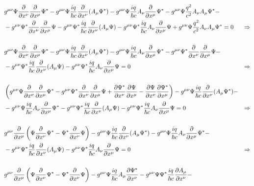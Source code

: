 \begin{align*}
  &g^{\mu\nu} \Psi \party{}{x^\nu} \party{}{x^\mu} \Psi^*-   g^{\mu\nu} \Psi \frac{iq}{\hbar c}\party{}{x^\nu}(A_\mu\Psi^*)-g^{\mu\nu}  \Psi \frac{iq}{\hbar c} A_\nu \party{}{x^\mu} \Psi^*  -g^{\mu\nu} \Psi \frac{q^2}{c^2}A_\nu A_\mu \Psi^* -
  \\& -g^{\mu\nu} \Psi^* \party{}{x^\nu} \party{}{x^\mu} \Psi - g^{\mu\nu} \Psi^* \frac{iq}{\hbar c}\party{}{x^\nu}(A_\mu \Psi) - g^{\mu\nu}  \Psi^*  \frac{iq}{\hbar c} A_\nu \party{}{x^\mu} \Psi  +g^{\mu\nu} \Psi \frac{q^2}{c^2}A_\nu A_\mu \Psi^* =0  &\Rightarrow
  \\
  \\ &g^{\mu\nu} \Psi \party{}{x^\nu} \party{}{x^\mu} \Psi^*-   g^{\mu\nu} \Psi \frac{iq}{\hbar c}\party{}{x^\nu}(A_\mu\Psi^*)-g^{\mu\nu}  \Psi \frac{iq}{\hbar c} A_\nu \party{}{x^\mu} \Psi^*-g^{\mu\nu} \Psi^* \party{}{x^\nu} \party{}{x^\mu} \Psi -
  \\&-g^{\mu\nu} \Psi^* \frac{iq}{\hbar c}\party{}{x^\nu}(A_\mu \Psi) - g^{\mu\nu}  \Psi^*  \frac{iq}{\hbar c} A_\nu \party{}{x^\mu} \Psi =0  &\Rightarrow 
  \\
  \\ &\lbr g^{\mu\nu} \Psi \party{}{x^\nu} \party{}{x^\mu} \Psi^*-g^{\mu\nu} \Psi^* \party{}{x^\nu} \party{}{x^\mu} \Psi+ \party{\Psi^*}{x^\nu} \party{\Psi}{x^\mu}-\party{\Psi}{x^\nu} \party{\Psi^*}{x^\mu} \rbr -   g^{\mu\nu} \Psi \frac{iq}{\hbar c}\party{}{x^\nu}(A_\mu\Psi^*)-
  \\&-g^{\mu\nu}  \Psi \frac{iq}{\hbar c} A_\nu \party{}{x^\mu} \Psi^* -g^{\mu\nu} \Psi^* \frac{iq}{\hbar c}\party{}{x^\nu}(A_\mu \Psi) - g^{\mu\nu}  \Psi^*  \frac{iq}{\hbar c} A_\nu \party{}{x^\mu} \Psi =0  &\Rightarrow 
  \\
  \\ &g^{\mu\nu} \party{}{x^\mu} \lbr   \Psi\party{}{x^\nu}\Psi^*  - \Psi^* \party{}{x^\nu} \Psi \rbr - g^{\mu\nu} \Psi \frac{iq}{\hbar c}\party{}{x^\nu}(A_\mu\Psi^*)-g^{\mu\nu}  \Psi \frac{iq}{\hbar c} A_\nu \party{}{x^\mu} \Psi^*-
  \\& -g^{\mu\nu} \Psi^* \frac{iq}{\hbar c}\party{}{x^\nu}(A_\mu \Psi) - g^{\mu\nu}  \Psi^*  \frac{iq}{\hbar c} A_\nu \party{}{x^\mu} \Psi =0  &\Rightarrow 
  \\
  \\ &g^{\mu\nu} \party{}{x^\mu} \lbr   \Psi\party{}{x^\nu}\Psi^*  - \Psi^* \party{}{x^\nu} \Psi \rbr - g^{\mu\nu} \Psi \frac{iq}{\hbar c} A_\mu\party{\Psi^*}{x^\nu}- g^{\mu\nu} \Psi \Psi^* \frac{iq}{\hbar c}\party{A_\mu}{x^\nu}-

\end{align*}
